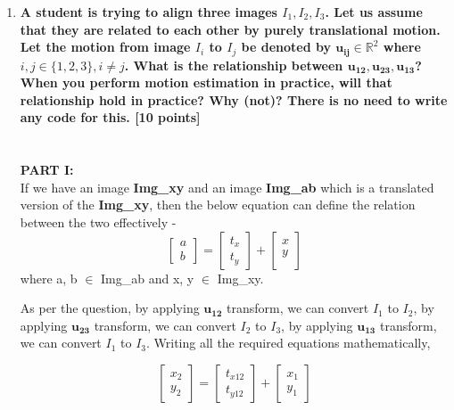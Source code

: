 \documentclass{article}
\begin{document}
\begin{enumerate}
\newpage
\item \textbf{A student is trying to align three images $I_1, I_2, I_3$. Let us assume that they are related to each other by purely translational motion. Let the motion from image $I_i$ to $I_j$ be denoted by $\boldsymbol{u_{ij}} \in \mathbb{R}^2$ where $i,j \in \{1,2,3\}, i \neq j$. What is the relationship between $\boldsymbol{u_{12}}, \boldsymbol{u_{23}}, \boldsymbol{u_{13}}$? When you perform motion estimation in practice, will that relationship hold in practice? Why (not)? There is no need to write any code for this. \textsf{[10 points]}}
\\
\\ 
\\\textbf{PART I:}\\
If we have an image \textbf{Img\_xy} and an image \textbf{Img\_ab} which is a translated version of the \textbf{Img\_xy}, then the below equation can define the relation between the two effectively - 
\begin{equation}
    \begin{bmatrix}
        a \\
        b
    \end{bmatrix}
          =
    \begin{bmatrix}
    t_x \\
    t_y
    \end{bmatrix}
       + 
    \begin{bmatrix}
        x \\
        y \\ 
    \end{bmatrix}
\end{equation}
where a, b $\in$ Img\_ab and x, y $\in$ Img\_xy.

As per the question, by applying $\boldsymbol{u_{12}}$ transform, we can convert $I_1$ to $I_2$, by applying $\boldsymbol{u_{23}}$ transform, we can convert $I_2$ to $I_3$, by applying $\boldsymbol{u_{13}}$ transform, we can convert $I_1$ to $I_3$. Writing all the required equations mathematically,

\begin{equation}
     \begin{bmatrix}
        x_2 \\
        y_2
    \end{bmatrix}
          =
    \begin{bmatrix}
    t_{x12} \\
    t_{y12}
    \end{bmatrix}
        + 
    \begin{bmatrix}
        x_1 \\
        y_1 
    \end{bmatrix}
\end{equation}



\end{enumerate}
\end{document}
